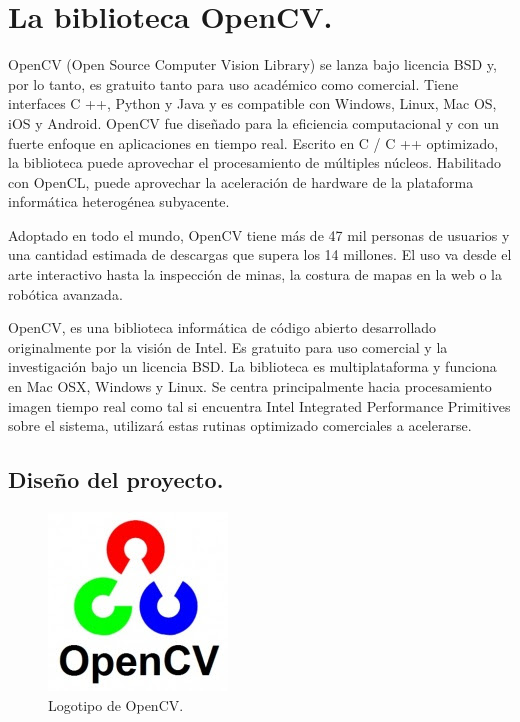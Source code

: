 \chapter{La biblioteca OpenCV.}

OpenCV (Open Source Computer Vision Library) se lanza bajo licencia BSD y, por lo tanto, es gratuito tanto para uso académico como comercial. Tiene interfaces C ++, Python y Java y es compatible con Windows, Linux, Mac OS, iOS y Android. OpenCV fue diseñado para la eficiencia computacional y con un fuerte enfoque en aplicaciones en tiempo real. Escrito en C / C ++ optimizado, la biblioteca puede aprovechar el procesamiento de múltiples núcleos. Habilitado con OpenCL, puede aprovechar la aceleración de hardware de la plataforma informática heterogénea subyacente.

Adoptado en todo el mundo, OpenCV tiene más de 47 mil personas de usuarios y una cantidad estimada de descargas que supera los 14 millones. El uso va desde el arte interactivo hasta la inspección de minas, la costura de mapas en la web o la robótica avanzada. \cite{OpenCVWebSite}

OpenCV, es una biblioteca informática de código abierto desarrollado originalmente por la visión de Intel. Es gratuito para uso comercial y la investigación bajo un licencia BSD. La biblioteca es multiplataforma y funciona en Mac OSX, Windows y Linux. Se centra principalmente hacia procesamiento imagen tiempo real como tal si encuentra Intel Integrated Performance Primitives sobre el sistema, utilizará estas rutinas optimizado comerciales a acelerarse.

\section{Diseño del proyecto.}

\begin{figure}[h!]
  	\centering
	\includegraphics[scale=1]{FotosPaginasWebHeliostatos/unnamed(9).jpg}
	\caption{Logotipo de OpenCV.
	\label{fig:FotosPaginasWebHeliostatos/unnamed(9).jpg}}
\end{figure}


